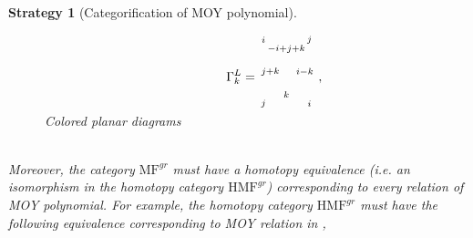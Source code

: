 \documentclass[10pt]{amsart}
\theoremstyle{break}
\newtheorem{str}[de]{Strategy}
\begin{document}
\begin{str}[Categorification of MOY polynomial]
\begin{itemize}
\begin{figure}[hbt]
\begin{eqnarray*}
\hspace{1cm} \hspace{1cm} \Gamma^L_k=
\unitlength 0.1in
\begin{picture}(  6.5000,  5.000)(  1.9500,-7.000)
\special{pn 8}\special{pa 200 1000}\special{pa 200 1000}\special{fp}\special{pn 8}\special{pa 200 1000}\special{pa 200 200}\special{fp}\special{sh 1}\special{pa 200 200}\special{pa 180 268}\special{pa 200 254}\special{pa 220 268}\special{pa 200 200}\special{fp}\special{sh 1}\special{pa 200 400}\special{pa 180 468}\special{pa 200 454}\special{pa 220 468}\special{pa 200 400}\special{fp}\special{sh 1}\special{pa 200 800}\special{pa 180 868}\special{pa 200 854}\special{pa 220 868}\special{pa 200 800}\special{fp}\special{pn 8}\special{pa 800 800}\special{pa 200 800}\special{fp}\special{sh 1}\special{pa 200 800}\special{pa 267 820}\special{pa 253 800}\special{pa 267 780}\special{pa 200 800}\special{fp}\special{pn 8}\special{pa 800 400}\special{pa 200 400}\special{fp}\special{sh 1}\special{pa 800 400}\special{pa 733 420}\special{pa 747 400}\special{pa 733 380}\special{pa 800 400}\special{fp}\special{pn 8}\special{pa 800 1000}\special{pa 800 200}\special{fp}\special{sh 1}\special{pa 800 200}\special{pa 780 268}\special{pa 800 254}\special{pa 820 268}\special{pa 800 200}\special{fp}\special{sh 1}\special{pa 800 400}\special{pa 780 468}\special{pa 800 454}\special{pa 820 468}\special{pa 800 400}\special{fp}\special{sh 1}\special{pa 800 800}\special{pa 780 868}\special{pa 800 854}\special{pa 820 868}\special{pa 800 800}\special{fp}\put(2.5000,-9.5000){\makebox(0,0){${}_{j}$}}\put(7.5000,-9.5000){\makebox(0,0){${}_{i}$}}\put(7.5000,-2.5000){\makebox(0,0){${}_{j}$}}\put(2.5000,-2.5000){\makebox(0,0){${}_{i}$}}\put(5.0000,-8.5000){\makebox(0,0){${}_{k}$}}\put(3.250000,-6.0000){\makebox(0,0){${}_{j+k}$}}\put(5.0000,-3.5000){\makebox(0,0){${}_{-i+j+k}$}}\put(7.000,-6.0000){\makebox(0,0){${}_{i-k}$}}\end{picture}
,\\[1em]
\end{eqnarray*}
\caption{Colored planar diagrams}
\end{figure}
\\
Moreover, the category ${{\mathrm{MF}}}^{gr}$ must have a homotopy equivalence (i.e. an isomorphism in the homotopy category ${{\mathrm{HMF}}}^{gr}$) corresponding to every relation of MOY polynomial. For example, the homotopy category ${{\mathrm{HMF}}}^{gr}$ must have the following equivalence corresponding to MOY relation in \cite{MOY},
\begin{eqnarray*}

\end{eqnarray*}
\end{itemize}
\end{str}
\end{document}
